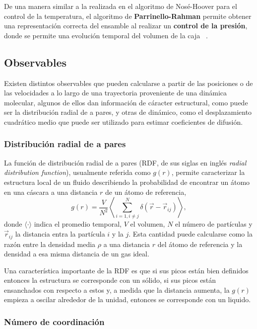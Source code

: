 De una manera similar a la realizada en el algoritmo de Nosé-Hoover para el 
control de la temperatura, el algoritmo de \textbf{Parrinello-Rahman} permite
obtener una representación correcta del ensamble al realizar un \textbf{control
de la presión}, donde se permite una evolución temporal del volumen de la caja
~\cite{parrinello-rahman}.


\subsection{Observables}

Existen distintos observables que pueden calcularse a partir de las posiciones o
de las velocidades a lo largo de una trayectoria proveniente de una dinámica 
molecular, algunos de ellos dan información de cáracter estructural, como puede 
ser la distribución radial de a pares, y otras de dinámico, como el desplazamiento 
cuadrático medio que puede ser utilizado para estimar coeficientes de difusión.

\subsubsection{Distribución radial de a pares}

La función de distribución radial de a pares (RDF, de sus siglas en inglés
\textit{radial distribution function}), usualmente referida como $g(r)$, permite 
caracterizar la estructura local de un fluido describiendo la probabilidad de 
encontrar un átomo en una cáscara a una distancia $r$ de un átomo de referencia,
$$
g(r) = \frac{V}{N^2} \left\langle \sum_{i=1, i\neq j}^N \delta(\vec{r} - \vec{r}_{ij}) \right\rangle,
$$
donde $\langle \cdot \rangle$ indica el promedio temporal, $V$ el volumen, $N$ el
número de partículas y $\vec{r}_{ij}$ la distancia entra la partícula $i$ y la $j$.
Esta cantidad puede calcularse como la razón entre la densidad media $\rho$ a
una distancia $r$ del átomo de referencia y la densidad a esa misma distancia de 
un gas ideal.

Una característica importante de la RDF es que si sus picos están bien definidos
entonces la estructura se corresponde con un sólido, si sus picos están ensanchados
con respecto a estos y, a medida que la distancia aumenta, la $g(r)$ empieza a 
oscilar alrededor de la unidad, entonces se corresponde con un liquido.

\subsubsection{Número de coordinación}


